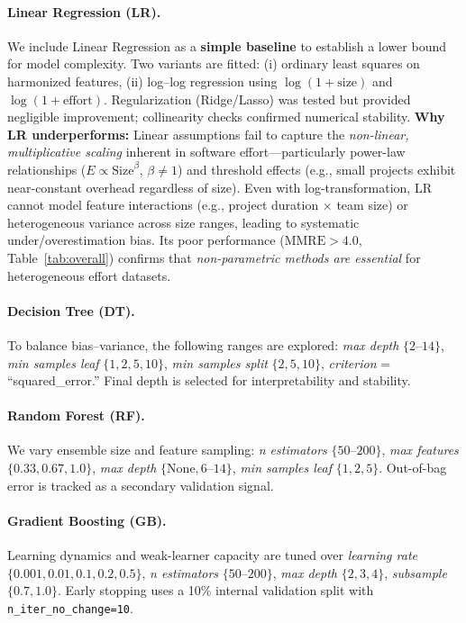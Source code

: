 \documentclass{ieeeaccess}
\begin{document}
\paragraph{Linear Regression (LR).}
We include Linear Regression as a \textbf{simple baseline} to establish a lower bound for model complexity.
Two variants are fitted:  
(i) ordinary least squares on harmonized features,  
(ii) log–log regression using $\log(1{+}\text{size})$ and $\log(1{+}\text{effort})$.  
Regularization (Ridge/Lasso) was tested but provided negligible improvement; collinearity checks confirmed numerical stability.
\textbf{Why LR underperforms:} Linear assumptions fail to capture the \textit{non-linear, multiplicative scaling} inherent in software effort—particularly power-law relationships ($E \propto \text{Size}^{\beta}$, $\beta \neq 1$) and threshold effects (e.g., small projects exhibit near-constant overhead regardless of size). Even with log-transformation, LR cannot model feature interactions (e.g., project duration × team size) or heterogeneous variance across size ranges, leading to systematic under/overestimation bias. Its poor performance ($\text{MMRE} > 4.0$, Table~\ref{tab:overall}) confirms that \textit{non-parametric methods are essential} for heterogeneous effort datasets.

\paragraph{Decision Tree (DT).}
To balance bias–variance, the following ranges are explored:  
\emph{max depth} $\{2$–$14\}$,  
\emph{min samples leaf} $\{1,2,5,10\}$,  
\emph{min samples split} $\{2,5,10\}$,  
\emph{criterion} = “squared\_error.”  
Final depth is selected for interpretability and stability.

\paragraph{Random Forest (RF).}
We vary ensemble size and feature sampling:  
\emph{n estimators} $\{50$–$200\}$,  
\emph{max features} $\{0.33,0.67,1.0\}$,  
\emph{max depth} $\{\text{None},6$–$14\}$,  
\emph{min samples leaf} $\{1,2,5\}$.  
Out-of-bag error is tracked as a secondary validation signal.

\paragraph{Gradient Boosting (GB).}
Learning dynamics and weak-learner capacity are tuned over  
\emph{learning rate} $\{0.001,0.01,0.1,0.2,0.5\}$,  
\emph{n estimators} $\{50$–$200\}$,  
\emph{max depth} $\{2,3,4\}$,  
\emph{subsample} $\{0.7,1.0\}$.  
Early stopping uses a 10\% internal validation split with 
\texttt{n\_iter\_no\_change=10}.
\end{document}
